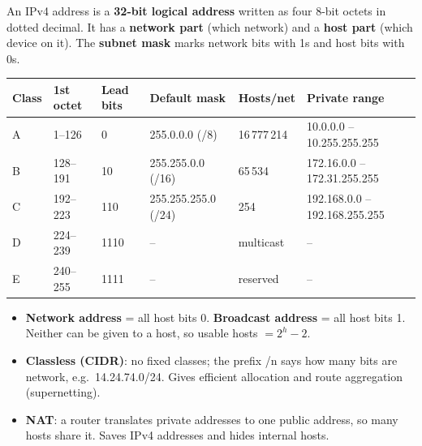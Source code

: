 \documentclass[10pt]{article}
\begin{document}
An IPv4 address is a \textbf{32-bit logical address} written as four 8-bit octets in dotted decimal.
It has a \textbf{network part} (which network) and a \textbf{host part} (which device on it).
The \textbf{subnet mask} marks network bits with 1s and host bits with 0s.

\begin{center}
\end{center}


\begin{tabularx}{\linewidth}{@{}lllllX@{}}
\toprule
\textbf{Class} & \textbf{1st octet} & \textbf{Lead bits} & \textbf{Default mask} & \textbf{Hosts/net} & \textbf{Private range}\\
\midrule
A & 1--126 & 0 & 255.0.0.0 (/8) & 16\,777\,214 & 10.0.0.0 -- 10.255.255.255\\
B & 128--191 & 10 & 255.255.0.0 (/16) & 65\,534 & 172.16.0.0 -- 172.31.255.255\\
C & 192--223 & 110 & 255.255.255.0 (/24) & 254 & 192.168.0.0 -- 192.168.255.255\\
D & 224--239 & 1110 & -- & multicast & --\\
E & 240--255 & 1111 & -- & reserved & --\\
\bottomrule
\end{tabularx}


\begin{itemize}
\item \textbf{Network address} = all host bits 0. \textbf{Broadcast address} = all host bits 1. Neither can be given to a host, so usable hosts $= 2^h - 2$.
\item \textbf{Classless (CIDR)}: no fixed classes; the prefix /n says how many bits are network, e.g.\ 14.24.74.0/24. Gives efficient allocation and route aggregation (supernetting).
\item \textbf{NAT}: a router translates private addresses to one public address, so many hosts share it. Saves IPv4 addresses and hides internal hosts.
\end{itemize}
\end{document}
